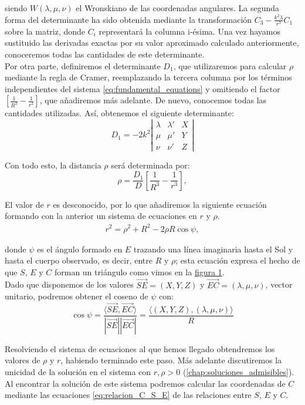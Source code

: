 \documentclass[11pt]{book}
\begin{document}
\noindent siendo $W(\lambda,\mu,\nu)$ el Wronskiano de las coordenadas angulares. La segunda forma del determinante ha sido obtenida mediante la transformación $C_3-\frac{k^2\lambda}{r^3}C_1$ sobre la matriz, donde $C_i$ representará la columna i-ésima. Una vez hayamos sustituido las derivadas exactas por su valor aproximado calculado anteriormente, conoceremos todas las cantidades de este determinante.\\

Por otra parte, definiremos el determinante $D_1$, que utilizaremos para calcular $\rho$ mediante la regla de Cramer, reemplazando la tercera columna por los términos independientes del sistema \eqref{eq:fundamental_equations} y omitiendo el factor $[\frac{1}{R^3}-\frac{1}{r^3}]$, que añadiremos más adelante. De nuevo, conocemos todas las cantidades utilizadas. Así, obtenemos el siguiente determinante:
\[
D_1 = -2k^2
\left|
\begin{array}{ccc}
\lambda & \lambda' & X\\
\mu & \mu' & Y\\
\nu & \nu' & Z
\end{array}
\right|
\]

Con todo esto, la distancia $\rho$ será determinada por:
\[
\rho = \frac{D_1}{D}[\frac{1}{R^3}-\frac{1}{r^3}],
\]

El valor de $r$ es desconocido, por lo que añadiremos la siguiente ecuación formando con la anterior un sistema de ecuaciones en $r$ y $\rho$.
\begin{align}
r^2=\rho^2+R^2-2\rho R\cos\psi,
\label{eq:triangle_relations_1}
\end{align}

\noindent donde $\psi$ es el ángulo formado en $E$ trazando una línea imaginaria hasta el Sol y hasta el cuerpo observado, es decir, entre $R$ y $\rho$; esta ecuación expresa el hecho de que $S$, $E$ y $C$ forman un triángulo como vimos en la \hyperref[figure:1]{figura 1}.\\

Dado que disponemos de los valores $\overrightarrow{SE}=(X,Y,Z)$ y $\overrightarrow{EC}=(\lambda,\mu,\nu)$, vector unitario, podremos obtener el coseno de $\psi$ con:
\[
\cos{\psi}=\frac{\langle\overrightarrow{SE},\overrightarrow{EC}\rangle}{|\overrightarrow{SE}||\overrightarrow{EC}|}=\frac{\langle(X,Y,Z),(\lambda,\mu,\nu)\rangle}{R}
\]

Resolviendo el sistema de ecuaciones al que hemos llegado obtendremos los valores de $\rho$ y $r$, habiendo terminado este paso. Más adelante discutiremos la unicidad de la solución en el sistema con $r,\rho>0$ (\ref{chap:soluciones_admisibles}). Al encontrar la solución de este sistema podremos calcular las coordenadas de $C$ mediante las ecuaciones \eqref{eq:relacion_C_S_E} de las relaciones entre $S$, $E$ y $C$.\\
\end{document}
